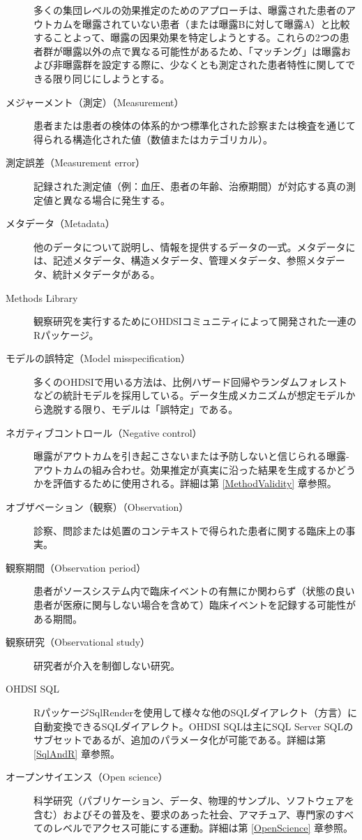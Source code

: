 \documentclass[
  11pt]{book}
\theoremstyle{definition}
\theoremstyle{definition}
\theoremstyle{definition}
\theoremstyle{definition}
\theoremstyle{remark}
\begin{document}
\begin{description}
多くの集団レベルの効果推定のためのアプローチは、曝露された患者のアウトカムを曝露されていない患者（または曝露Bに対して曝露A）と比較することよって、曝露の因果効果を特定しようとする。これらの2つの患者群が曝露以外の点で異なる可能性があるため、「マッチング」は曝露および非曝露群を設定する際に、少なくとも測定された患者特性に関してできる限り同じにしようとする。
\item[メジャーメント（測定）（Measurement）]
患者または患者の検体の体系的かつ標準化された診察または検査を通じて得られる構造化された値（数値またはカテゴリカル）。
\item[測定誤差（Measurement error）]
記録された測定値（例：血圧、患者の年齢、治療期間）が対応する真の測定値と異なる場合に発生する。
\item[メタデータ（Metadata）]
他のデータについて説明し、情報を提供するデータの一式。メタデータには、記述メタデータ、構造メタデータ、管理メタデータ、参照メタデータ、統計メタデータがある。
\item[Methods Library]
観察研究を実行するためにOHDSIコミュニティによって開発された一連のRパッケージ。
\item[モデルの誤特定（Model misspecification）]
多くのOHDSIで用いる方法は、比例ハザード回帰やランダムフォレストなどの統計モデルを採用している。データ生成メカニズムが想定モデルから逸脱する限り、モデルは「誤特定」である。
\item[ネガティブコントロール（Negative control）]
曝露がアウトカムを引き起こさないまたは予防しないと信じられる曝露-アウトカムの組み合わせ。効果推定が真実に沿った結果を生成するかどうかを評価するために使用される。詳細は第 \ref{MethodValidity} 章参照。
\item[オブザベーション（観察）（Observation）]
診察、問診または処置のコンテキストで得られた患者に関する臨床上の事実。
\item[観察期間（Observation period）]
患者がソースシステム内で臨床イベントの有無にか関わらず（状態の良い患者が医療に関与しない場合を含めて）臨床イベントを記録する可能性がある期間。
\item[観察研究（Observational study）]
研究者が介入を制御しない研究。
\item[OHDSI SQL]
RパッケージSqlRenderを使用して様々な他のSQLダイアレクト（方言）に自動変換できるSQLダイアレクト。OHDSI SQLは主にSQL Server SQLのサブセットであるが、追加のパラメータ化が可能である。詳細は第 \ref{SqlAndR} 章参照。
\item[オープンサイエンス（Open science）]
科学研究（パブリケーション、データ、物理的サンプル、ソフトウェアを含む）およびその普及を、要求のあった社会、アマチュア、専門家のすべてのレベルでアクセス可能にする運動。詳細は第 \ref{OpenScience} 章参照。

\end{description}
\end{document}
